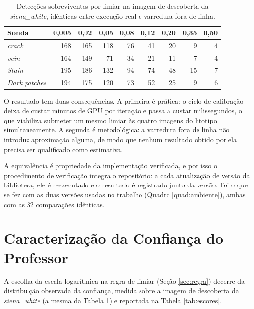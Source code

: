\begin{table}[ht]
  \caption{Detecções sobreviventes por limiar na imagem de descoberta da \textit{siena\_white}, idênticas entre execução real e varredura fora de linha.}
  \label{tab:d18}
  \centering
  \begin{tabular}{lrrrrrrrr}
    \hline
    \bfseries Sonda & \bfseries 0,005 & \bfseries 0,02 & \bfseries 0,05 & \bfseries 0,08 & \bfseries 0,12 & \bfseries 0,20 & \bfseries 0,35 & \bfseries 0,50 \\
    \hline
    \textit{crack}        & 168 & 165 & 118 & 76 & 41 & 20 & 9 & 4 \\
    \textit{vein}         & 164 & 149 & 71  & 34 & 21 & 11 & 7 & 4 \\
    \textit{Stain}        & 195 & 186 & 132 & 94 & 74 & 48 & 15 & 7 \\
    \textit{Dark patches} & 194 & 175 & 120 & 73 & 52 & 25 & 9 & 6 \\
    \hline
  \end{tabular}
\end{table}

O resultado tem duas consequências. A primeira é prática: o ciclo de calibração deixa de custar minutos de GPU por iteração e passa a custar milissegundos, o que viabiliza submeter um mesmo limiar às quatro imagens do litotipo simultaneamente. A segunda é metodológica: a varredura fora de linha não introduz aproximação alguma, de modo que nenhum resultado obtido por ela precisa ser qualificado como estimativa.

A equivalência é propriedade da implementação verificada, e por isso o procedimento de verificação integra o repositório: a cada atualização de versão da biblioteca, ele é reexecutado e o resultado é registrado junto da versão. Foi o que se fez com as duas versões usadas no trabalho (Quadro \ref{quad:ambiente}), ambas com as 32 comparações idênticas.

\section{Caracterização da Confiança do Professor}
\label{sec:res_escores}

A escolha da escala logarítmica na regra de limiar (Seção \ref{sec:regra}) decorre da distribuição observada da confiança, medida sobre a imagem de descoberta da \textit{siena\_white} (a mesma da Tabela \ref{tab:d18}) e reportada na Tabela \ref{tab:escores}.

